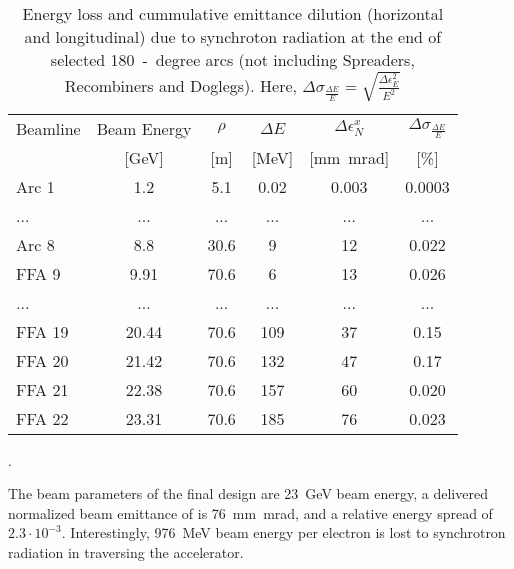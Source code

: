 \begin{table}[!ht]
  \centering
  \small
  \begin{tabular}{lccccc} 
  \hline
  Beamline & Beam Energy & $\rho$ & $\Delta E$  & $\Delta \epsilon^x_N$ & $\Delta \sigma_{\frac{\Delta E}{E}}$  \\
    & [\si{GeV}] & [\si{m}] & [\si{MeV}]&  [\si{mm~mrad}] &  [\si{\%}]\\
  \hline\hline
  Arc 1 & 1.2 & 5.1 & 0.02 & 0.003 & 0.0003\\
  ... & ... & ... & ... & ... & ...\\
  Arc 8 & 8.8 & 30.6 & 9 & 12 & 0.022\\
  FFA 9 & 9.91 & 70.6 & 6 & 13 & 0.026\\
  ... & ... & ... & ... & ... & ...\\
  FFA 19 & 20.44 & 70.6 & 109 & 37 & 0.15\\
  FFA 20 & 21.42 & 70.6 & 132 & 47 & 0.17\\
  FFA 21 & 22.38 & 70.6 & 157 & 60 & 0.020\\
  FFA 22 & 23.31 & 70.6 & 185 & 76 & 0.023\\
  \hline
  \end{tabular}
  \caption{Energy loss and cummulative emittance dilution (horizontal and longitudinal) due to synchroton radiation at the end of selected  \SI{180}{-degree} arcs (not including Spreaders, Recombiners and Doglegs). Here, $\Delta \sigma_{\frac{\Delta E}{E}} = \sqrt{\tfrac{\Delta \epsilon_E^2}{E^2}}$}.
  \label{tab:SREmittance}
\end{table}
%
The beam parameters of the final design are \SI{23}{~GeV} beam energy, a delivered normalized beam emittance of  is \SI{76}{~mm~mrad}, and a relative energy spread of $2.3 \cdot 10^{-3}$. Interestingly, \SI{976}{~MeV} beam energy per electron is lost to synchrotron radiation in traversing the accelerator.